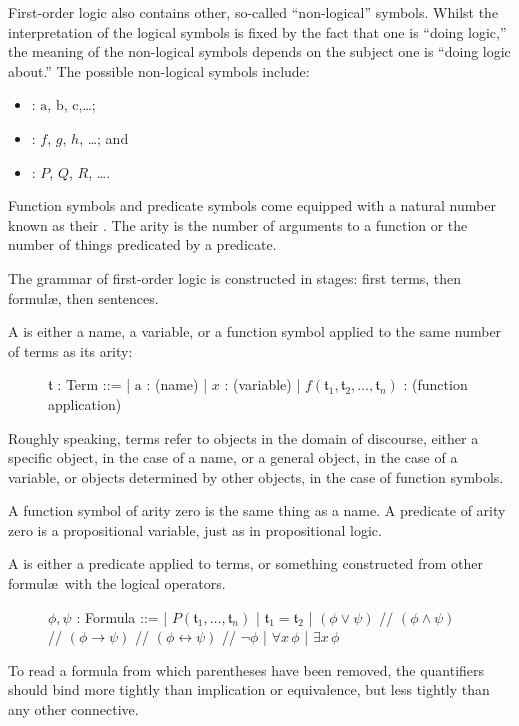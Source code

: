 \documentclass{article}
\newcommand{\nm}[1]{\mathrm{#1}} %
\newcommand{\var}[1]{\mathit{#1}} %
\newcommand{\term}[1]{\mathfrak{#1}} %
\begin{document}
First-order logic also contains other, so-called ``non-logical''
symbols. Whilst the interpretation of the logical symbols is fixed by
the fact that one is ``doing logic,'' the meaning of the non-logical
symbols depends on the subject one is ``doing logic about.'' The
possible non-logical symbols include:
\begin{itemize}
\item {}: $\nm{a}$, $\nm{b}$, $\nm{c}$,\dots;
\item {}: $f$, $g$, $h$, \dots; and
\item {}: $P$, $Q$, $R$, \dots.
\end{itemize}
Function symbols and predicate symbols come equipped with a natural
number known as their . The arity is the number of arguments
to a function or the number of things predicated by a predicate.

The grammar of first-order logic is constructed in stages: first terms, then formul\ae, then sentences.

A  is either a name, a variable, or a function symbol applied
to the same number of terms as its arity:
\begin{figure}[ht]
  \centering
  \begin{bnf}
    $\term{t}$ : Term ::=
    | $\nm{a}$  : (name)
    | $\var{x}$ : (variable)
    | $f(\term{t}_1, \term{t}_2, \dotsc, \term{t}_n)$ : (function application)
  \end{bnf}
\end{figure}
Roughly speaking, terms refer to objects in the domain of discourse,
either a specific object, in the case of a name, or a general object, in
the case of a variable, or objects determined by other objects, in the
case of function symbols.

A function symbol of arity zero is the same thing as a name. A predicate
of arity zero is a propositional variable, just as in propositional
logic.

A  is either a predicate applied to terms, or something constructed from other formul\ae\ with the logical operators.
\begin{figure}[ht]
  \centering
  \begin{bnf}
    $\phi, \psi$ : Formula ::=
    | $P(\term{t}_1,\dotsc,\term{t}_n)$ 
    | $\term{t}_1 = \term{t}_2$ 
    | $(\phi\vee\psi)$ // $(\phi\wedge\psi)$ // $(\phi\rightarrow\psi)$ // $(\phi\leftrightarrow\psi)$ // $\neg\phi$
    | $\forall \var{x}\,\phi$
    | $\exists \var{x}\,\phi$ 
  \end{bnf}
\end{figure}
To read a formula from which parentheses have been removed, the
quantifiers should bind more tightly than implication or equivalence,
but less tightly than any other connective.
\end{document}

